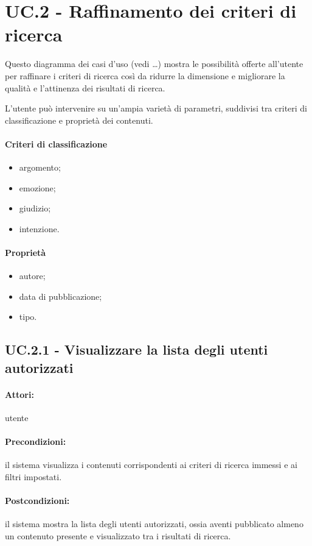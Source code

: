 \documentclass[10pt,a4paper,headinclude,footinclude,hidelinks]{scrreprt} %
\begin{document}
	\section{UC.2 - Raffinamento dei criteri di ricerca}
	\label{ch:stage:ar:uc:2}
	Questo diagramma dei casi d'uso (vedi \ldots) mostra le possibilità offerte all'utente per raffinare i criteri di ricerca così da ridurre la dimensione e migliorare la qualità e l'attinenza dei risultati di ricerca.

	L'utente può intervenire su un'ampia varietà di parametri, suddivisi tra criteri di classificazione e proprietà dei contenuti.

	\paragraph{Criteri di classificazione}
	\begin{itemize}
	\item argomento;
	\item emozione;
	\item giudizio;
	\item intenzione.
	\end{itemize}

	\paragraph{Propriet\`a}
	\begin{itemize}
	\item autore;
	\item data di pubblicazione;
	\item tipo.
	\end{itemize}

	\subsection[UC.2.1]{UC.2.1 - Visualizzare la lista degli utenti autorizzati}
	\label{sec:stage:ar:uc:2_1}
	\paragraph{Attori:} utente
	\paragraph{Precondizioni:} il sistema visualizza i contenuti corrispondenti ai criteri di ricerca immessi e ai filtri impostati.
	\paragraph{Postcondizioni:} il sistema mostra la lista degli utenti autorizzati, ossia aventi pubblicato almeno un contenuto presente e visualizzato tra i risultati di ricerca.
\end{document}

